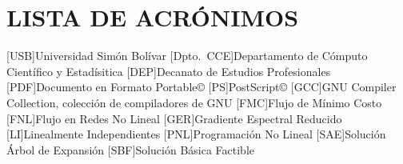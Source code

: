 
\chapter*{LISTA DE ACR\'ONIMOS}
\begin{acronym}
[USB]{Universidad Sim\'on Bol\'ivar}
[Dpto.~CCE]{Departamento de Cómputo Científico y Estadísitica}
[DEP]{Decanato de Estudios Profesionales}
[PDF]{Documento en Formato Portable\copyright}
[PS]{PostScript\copyright}
[GCC]{GNU Compiler Collection, colección de compiladores de GNU}
[FMC]{Flujo de Mínimo Costo}
[FNL]{Flujo en Redes No Lineal}
[GER]{Gradiente Espectral Reducido}
[LI]{Linealmente Independientes}
[PNL]{Programaci\'on No Lineal}
[SAE]{Soluci\'on \'Arbol de Expansi\'on}
[SBF]{Soluci\'on B\'asica Factible}
\end{acronym}
\clearpage
